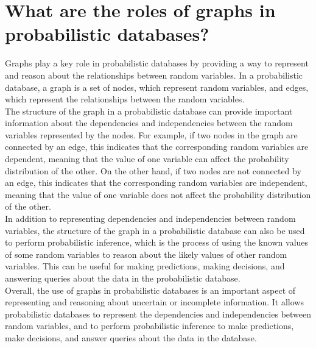 \chapter{What are the roles of graphs in probabilistic databases?}

Graphs play a key role in probabilistic databases by providing a way to represent and reason about the relationships between random variables. In a probabilistic database, a graph is a set of nodes, which represent random variables, and edges, which represent the relationships between the random variables. \\

The structure of the graph in a probabilistic database can provide important information about the dependencies and independencies between the random variables represented by the nodes. For example, if two nodes in the graph are connected by an edge, this indicates that the corresponding random variables are dependent, meaning that the value of one variable can affect the probability distribution of the other. On the other hand, if two nodes are not connected by an edge, this indicates that the corresponding random variables are independent, meaning that the value of one variable does not affect the probability distribution of the other. \\


In addition to representing dependencies and independencies between random variables, the structure of the graph in a probabilistic database can also be used to perform probabilistic inference, which is the process of using the known values of some random variables to reason about the likely values of other random variables. This can be useful for making predictions, making decisions, and answering queries about the data in the probabilistic database.\\


Overall, the use of graphs in probabilistic databases is an important aspect of representing and reasoning about uncertain or incomplete information. It allows probabilistic databases to represent the dependencies and independencies between random variables, and to perform probabilistic inference to make predictions, make decisions, and answer queries about the data in the database.\\


